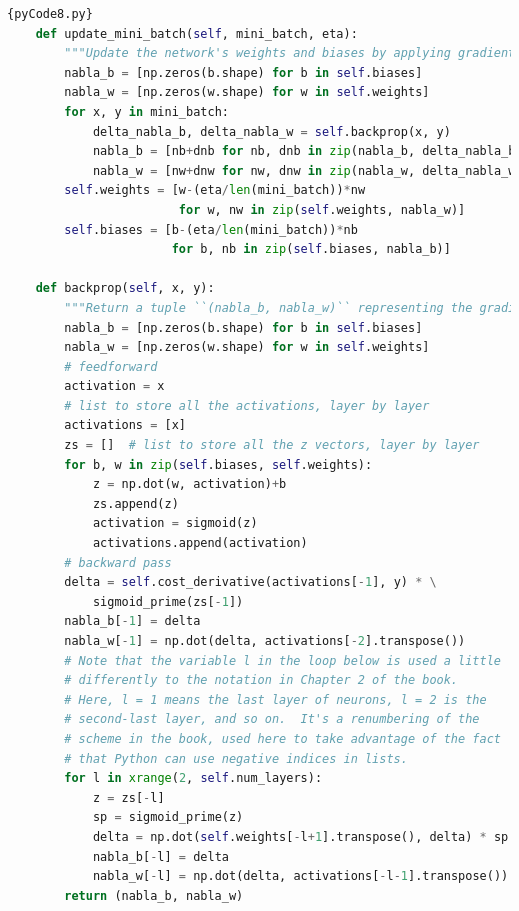 \documentclass[a4paper,12pt]{report}%
\begin{document}
\begin{lstlisting}[language=Python,breaklines,basicstyle=\footnotesize\ttfamily]{pyCode8.py}
    def update_mini_batch(self, mini_batch, eta):
        """Update the network's weights and biases by applying gradient descent using backpropagation to a single mini batch. The ``mini_batch`` is a list of tuples ``(x, y)``, and ``eta``  is the learning rate."""
        nabla_b = [np.zeros(b.shape) for b in self.biases]
        nabla_w = [np.zeros(w.shape) for w in self.weights]
        for x, y in mini_batch:
            delta_nabla_b, delta_nabla_w = self.backprop(x, y)
            nabla_b = [nb+dnb for nb, dnb in zip(nabla_b, delta_nabla_b)]
            nabla_w = [nw+dnw for nw, dnw in zip(nabla_w, delta_nabla_w)]
        self.weights = [w-(eta/len(mini_batch))*nw
                        for w, nw in zip(self.weights, nabla_w)]
        self.biases = [b-(eta/len(mini_batch))*nb
                       for b, nb in zip(self.biases, nabla_b)]

    def backprop(self, x, y):
        """Return a tuple ``(nabla_b, nabla_w)`` representing the gradient for the cost function C_x.  ``nabla_b`` and ``nabla_w`` are layer-by-layer lists of numpy arrays, similar to ``self.biases`` and ``self.weights``."""
        nabla_b = [np.zeros(b.shape) for b in self.biases]
        nabla_w = [np.zeros(w.shape) for w in self.weights]
        # feedforward
        activation = x
        # list to store all the activations, layer by layer
        activations = [x]
        zs = []  # list to store all the z vectors, layer by layer
        for b, w in zip(self.biases, self.weights):
            z = np.dot(w, activation)+b
            zs.append(z)
            activation = sigmoid(z)
            activations.append(activation)
        # backward pass
        delta = self.cost_derivative(activations[-1], y) * \
            sigmoid_prime(zs[-1])
        nabla_b[-1] = delta
        nabla_w[-1] = np.dot(delta, activations[-2].transpose())
        # Note that the variable l in the loop below is used a little
        # differently to the notation in Chapter 2 of the book.
        # Here, l = 1 means the last layer of neurons, l = 2 is the
        # second-last layer, and so on.  It's a renumbering of the
        # scheme in the book, used here to take advantage of the fact
        # that Python can use negative indices in lists.
        for l in xrange(2, self.num_layers):
            z = zs[-l]
            sp = sigmoid_prime(z)
            delta = np.dot(self.weights[-l+1].transpose(), delta) * sp
            nabla_b[-l] = delta
            nabla_w[-l] = np.dot(delta, activations[-l-1].transpose())
        return (nabla_b, nabla_w)


\end{lstlisting}
\end{document}
